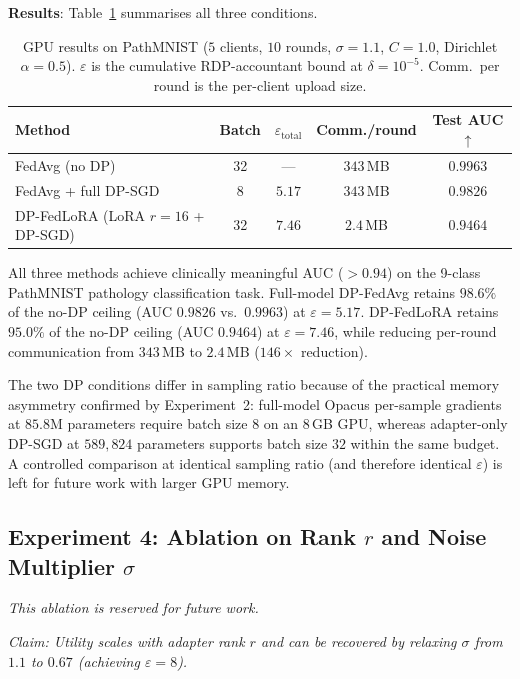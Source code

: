 ﻿\documentclass{article}
\newcommand{\method}{DP-FedLoRA}
\renewcommand{\eps}{\varepsilon}
\newcommand{\noise}{\sigma}
\newcommand{\clip}{C}
\begin{document}
\textbf{Results}: Table~\ref{tab:gpu_results} summarises all three
conditions.

\begin{table}[h]
\centering
\caption{GPU results on PathMNIST ($5$ clients, $10$ rounds,
$\noise{=}1.1$, $\clip{=}1.0$, Dirichlet $\alpha{=}0.5$).
$\eps$ is the cumulative RDP-accountant bound at $\delta{=}10^{-5}$.
Comm.\ per round is the per-client upload size.}
\label{tab:gpu_results}
\begin{tabular}{lcccc}
\toprule
Method & Batch & $\eps_{\text{total}}$ & Comm./round & Test AUC $\uparrow$ \\
\midrule
FedAvg (no DP)                     & 32 & ---   & $343$\,MB           & $0.9963$ \\
FedAvg + full DP-SGD               &  8 & $5.17$& $343$\,MB           & $0.9826$ \\
\method{} (LoRA $r{=}16$ + DP-SGD) & 32 & $7.46$& $\mathbf{2.4}$\,MB  & $0.9464$ \\
\bottomrule
\end{tabular}
\end{table}

All three methods achieve clinically meaningful AUC ($>0.94$) on the
9-class PathMNIST pathology classification task.
Full-model DP-FedAvg retains $98.6\%$ of the no-DP ceiling
(AUC $0.9826$ vs.\ $0.9963$) at $\eps{=}5.17$.
\method{} retains $95.0\%$ of the no-DP ceiling (AUC $0.9464$)
at $\eps{=}7.46$, while reducing per-round communication from
$343$\,MB to $2.4$\,MB ($146{\times}$ reduction).

The two DP conditions differ in sampling ratio because of the practical
memory asymmetry confirmed by Experiment~2: full-model Opacus
per-sample gradients at $85.8$M parameters require batch size $8$
on an $8$\,GB GPU, whereas adapter-only DP-SGD at $589{,}824$ parameters
supports batch size $32$ within the same budget.
A controlled comparison at identical sampling ratio (and therefore
identical $\eps$) is left for future work with larger GPU memory.

\subsection{Experiment 4: Ablation on Rank $r$ and Noise Multiplier $\noise$}

\emph{This ablation is reserved for future work.}

\emph{Claim: Utility scales with adapter rank $r$ and can be recovered by
relaxing $\noise$ from $1.1$ to $0.67$ (achieving $\eps{=}8$).}
\end{document}
